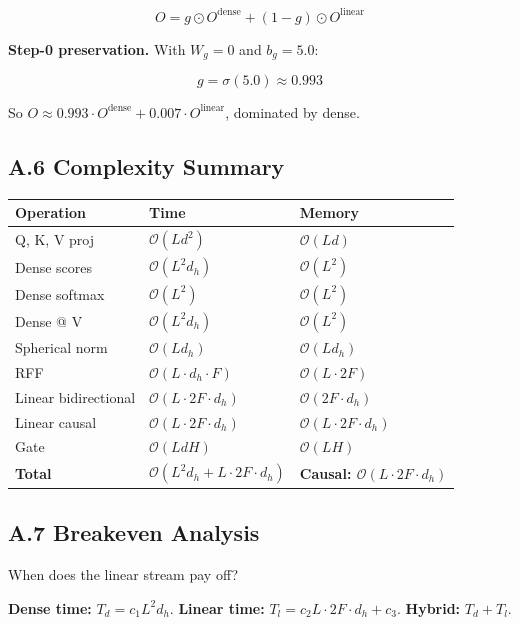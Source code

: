 \[
O = g \odot O^\text{dense} + (1 - g) \odot O^\text{linear}
\]

\textbf{Step-0 preservation.} With $W_g = 0$ and $b_g = 5.0$:

\[
g = \sigma(5.0) \approx 0.993
\]

So $O \approx 0.993 \cdot O^\text{dense} + 0.007 \cdot O^\text{linear}$, 
dominated by dense.

\subsection{A.6 Complexity Summary}

\begin{table}[H]
\centering
\small
\begin{tabular}{lll}
\toprule
\textbf{Operation} & \textbf{Time} & \textbf{Memory} \\
\midrule
Q, K, V proj & $\mathcal{O}(L d^2)$ & $\mathcal{O}(L d)$ \\
Dense scores & $\mathcal{O}(L^2 d_h)$ & $\mathcal{O}(L^2)$ \\
Dense softmax & $\mathcal{O}(L^2)$ & $\mathcal{O}(L^2)$ \\
Dense @ V & $\mathcal{O}(L^2 d_h)$ & $\mathcal{O}(L^2)$ \\
Spherical norm & $\mathcal{O}(L d_h)$ & $\mathcal{O}(L d_h)$ \\
RFF & $\mathcal{O}(L \cdot d_h \cdot F)$ & $\mathcal{O}(L \cdot 2F)$ \\
Linear bidirectional & $\mathcal{O}(L \cdot 2F \cdot d_h)$ & $\mathcal{O}(2F \cdot d_h)$ \\
Linear causal & $\mathcal{O}(L \cdot 2F \cdot d_h)$ & $\mathcal{O}(L \cdot 2F \cdot d_h)$ \\
Gate & $\mathcal{O}(L d H)$ & $\mathcal{O}(L H)$ \\
\textbf{Total} & \textbf{$\mathcal{O}(L^2 d_h + L \cdot 2F \cdot d_h)$} & \textbf{Causal: $\mathcal{O}(L \cdot 2F \cdot d_h)$} \\
\bottomrule
\end{tabular}
\end{table}

\subsection{A.7 Breakeven Analysis}

When does the linear stream pay off?

\textbf{Dense time:} $T_d = c_1 L^2 d_h$.
\textbf{Linear time:} $T_l = c_2 L \cdot 2F \cdot d_h + c_3$.
\textbf{Hybrid:} $T_d + T_l$.

